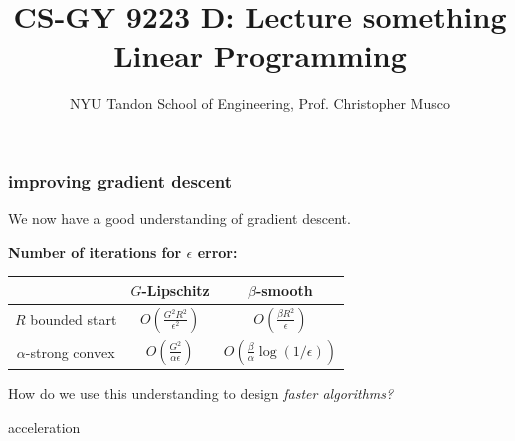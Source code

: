\documentclass[compress]{beamer}
\title{CS-GY 9223 D: Lecture something \\ Linear Programming}
\author{NYU Tandon School of Engineering, Prof. Christopher Musco}
\date{}
\begin{document}
\begin{frame}
	\titlepage 
\end{frame}

\begin{frame}
	\frametitle{improving gradient descent}
	We now have a good understanding of gradient descent. 
	
	\textbf{Number of iterations for $\epsilon$ error:}
	\begin{center}
		\begin{tabular}{c|cc}
			& $G$-Lipschitz & $\beta$-smooth   \\ \hline
			$R$ bounded start & $O\left(\frac{G^2R^2}{\epsilon^2}\right)$ & $O\left(\frac{\beta R^2}{\epsilon}\right)$ \\
			$\alpha$-strong convex & $O\left(\frac{G^2}{\alpha\epsilon}\right)$ & $O\left(\frac{\beta}{\alpha}\log(1/\epsilon)\right)$
		\end{tabular}
	\end{center}
	
	\vspace{1em}
	\alert{How do we use this understanding to design \emph{faster algorithms?}}
\end{frame}

\begin{frame}[standout]
	\begin{center}
		\large acceleration
	\end{center}
\end{frame}
\end{document}

